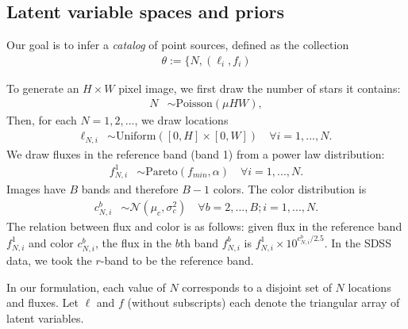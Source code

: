 \subsection{Latent variable spaces and priors}
Our goal is to infer a {\itshape catalog} of 
point sources, defined as the collection
\begin{align}
    \theta := \{N, (\ell_i, f_i)
\end{align}


To generate an $H \times W$ pixel image, we first draw the number of stars it contains:
\begin{align}
	N &\sim \text{Poisson}(\mu HW),
\end{align}
Then, for each $N = 1, 2, ... $, we draw locations 
\begin{align}
  \ell_{N, i} &\sim \text{Uniform}([0, H] \times [0, W]) \quad \forall i = 1, ..., N. 
 \end{align}
We draw fluxes in the reference band (band 1) from a power law distribution:
\begin{align}
    f_{N, i}^{1} & \sim \text{Pareto}(f_{min}, \alpha) \quad \forall i = 1, ..., N. 
\label{eq:flux_prior}
\end{align}
Images have $B$ bands and therefore $B - 1$ colors. The color distribution is
\begin{align}
  c_{N, i}^{b}  & \sim \mathcal{N}(\mu_c, \sigma^2_c) \quad \forall b = 2, ..., B; i = 1, ..., N.
\end{align}
The relation between flux and color is as follows: 
given flux in the reference band $f^1_{N, i}$ and color $c^b_{N, i}$,
the flux in the $b$th band $f^b_{N, i}$ is $f^1_{N, i} \times 10^{c^b_{N, i} / 2.5}$.
In the SDSS data, we took the $r$-band to be the reference band.

In our formulation, each value of $N$ corresponds to a disjoint set of $N$ locations and fluxes.
Let $\ell$ and $f$ (without subscripts) each denote the triangular array of latent variables.

